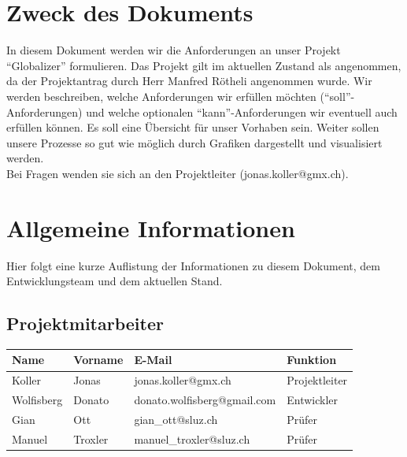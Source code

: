\documentclass[12pt]{article}
\begin{document}
  \section{Zweck des Dokuments}
    In diesem Dokument werden wir die Anforderungen an unser Projekt “Globalizer” formulieren. Das Projekt gilt im aktuellen Zustand als angenommen, da der Projektantrag durch Herr Manfred Rötheli angenommen wurde. Wir werden beschreiben, welche Anforderungen wir erfüllen möchten (“soll”-Anforderungen) und welche optionalen “kann”-Anforderungen wir eventuell auch erfüllen können. Es soll eine Übersicht für unser Vorhaben sein. Weiter sollen unsere Prozesse so gut wie möglich durch Grafiken dargestellt und visualisiert werden. \\
    Bei Fragen wenden sie sich an den Projektleiter (jonas.koller@gmx.ch).

  \section{Allgemeine Informationen}
    Hier folgt eine kurze Auflistung der Informationen zu diesem Dokument, dem Entwicklungsteam und dem aktuellen Stand.

  \subsection{Projektmitarbeiter}
    \begin{table}[h]
      \begin{tabularx}{\textwidth}{|l|l|X|l|}
        \hline
        \textbf{Name} & \textbf{Vorname}  & \textbf{E-Mail}                & \textbf{Funktion}     \\ \hline
        Koller        & Jonas             & jonas.koller@gmx.ch            & Projektleiter         \\ \hline
        Wolfisberg    & Donato            & donato.wolfisberg@gmail.com    & Entwickler            \\ \hline
        Gian          & Ott               & gian\_ott@sluz.ch              & Prüfer                \\ \hline
        Manuel        & Troxler           & manuel\_troxler@sluz.ch        & Prüfer                \\ \hline
      \end{tabularx}%
    \end{table}
\end{document}
